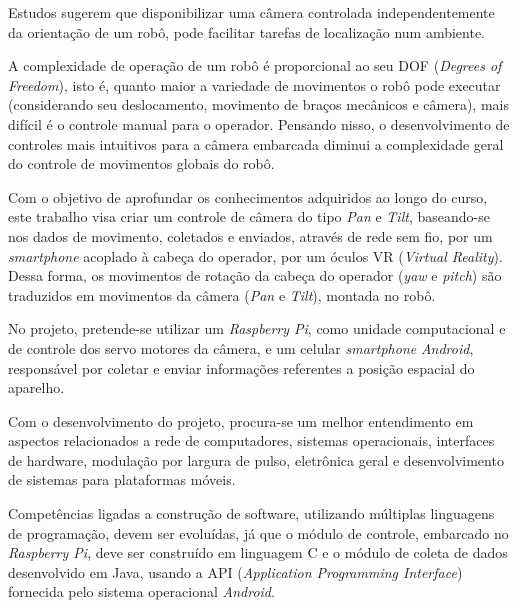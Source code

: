 Estudos sugerem que disponibilizar uma câmera controlada independentemente da orientação de um robô, pode facilitar tarefas de localização num ambiente. 

A complexidade de operação de um robô é proporcional ao seu DOF (\textit{Degrees of Freedom}), isto é, quanto maior a variedade de movimentos o robô pode executar (considerando seu deslocamento, movimento de braços mecânicos e câmera), mais difícil é o controle manual para o operador.
Pensando nisso, o desenvolvimento de controles mais intuitivos para a câmera embarcada diminui a complexidade geral do controle de movimentos globais do robô. \par

Com o objetivo de aprofundar os conhecimentos adquiridos ao longo do curso, este trabalho visa criar um controle de câmera do tipo \textit{Pan} e \textit{Tilt}, baseando-se nos dados de movimento, coletados e enviados, através de rede sem fio, por um \textit{smartphone} acoplado à cabeça do operador, por um óculos VR (\textit{Virtual Reality}). Dessa forma, os movimentos de rotação da cabeça do operador (\textit{yaw} e \textit{pitch}) são traduzidos em movimentos da câmera (\textit{Pan} e \textit{Tilt}), montada no robô. \par 

No projeto, pretende-se utilizar um \textit{Raspberry Pi}, como unidade computacional e de controle dos servo motores da câmera, e um celular \textit{smartphone} \textit{Android}, responsável por coletar e enviar informações referentes a posição espacial do aparelho. \par

Com o desenvolvimento do projeto, procura-se um melhor entendimento em aspectos relacionados a rede de computadores, sistemas operacionais, interfaces de hardware, modulação por largura de pulso, eletrônica geral e desenvolvimento de sistemas para plataformas móveis.\par

Competências ligadas a construção de software, utilizando múltiplas linguagens de programação, devem ser evoluídas, já que o módulo de controle, embarcado no \textit{Raspberry Pi}, deve ser construído em linguagem C e o módulo de coleta de dados desenvolvido em Java, usando a API (\textit{Application Programming Interface}) fornecida pelo sistema operacional \textit{Android}.\par

